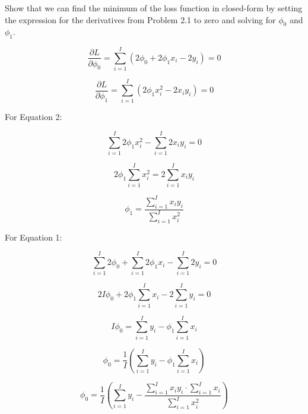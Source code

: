 \documentclass[10pt]{article}
\begin{document}
Show that we can find the minimum of the loss function in closed-form by setting the expression for the derivatives from Problem 2.1 to zero and solving for $\phi_0$ and $\phi_1$.


$$ \frac{\partial L}{\partial \phi_0} =  \sum_{i=1}^{I}  ( 2 \phi_0 + 2 \phi_1 x_i  - 2  y_i ) = 0  $$ 

$$\frac{\partial L}{\partial \phi_1} = \sum_{i=1}^{I}  ( 2 \phi_1 x_i^2 - 2 x_i y_i ) = 0    $$

For Equation 2: 

$$  \sum_{i=1}^{I}  2 \phi_1 x_i^2 - \sum_{i=1}^{I} 2 x_i y_i  = 0 $$

$$  2 \phi_1 \sum_{i=1}^{I}  x_i^2 = 2 \sum_{i=1}^{I}  x_i y_i $$ 

$$  \phi_1 =  \frac{ \sum_{i=1}^{I}  x_i y_i }{ \sum_{i=1}^{I}  x_i^2 } $$

For Equation 1: 

$$  \sum_{i=1}^{I}  2 \phi_0 + \sum_{i=1}^{I}  2 \phi_1 x_i  -  \sum_{i=1}^{I} 2  y_i  = 0  $$ 

$$  2 I  \phi_0 + 2 \phi_1 \sum_{i=1}^{I}   x_i  -  2 \sum_{i=1}^{I}  y_i  = 0  $$ 

$$   I  \phi_0 =    \sum_{i=1}^{I}  y_i    -  \phi_1 \sum_{i=1}^{I}   x_i   $$ 

$$    \phi_0 =  \frac{1}{I}  ( \sum_{i=1}^{I}  y_i    -  \phi_1 \sum_{i=1}^{I}   x_i  )  $$ 


$$    \phi_0 =  \frac{1}{I}  ( \sum_{i=1}^{I}  y_i    -  \frac{ \sum_{i=1}^{I}  x_i y_i \cdot  \sum_{i=1}^{I} x_i  }{ \sum_{i=1}^{I}  x_i^2 }    )  $$ 
\end{document}
